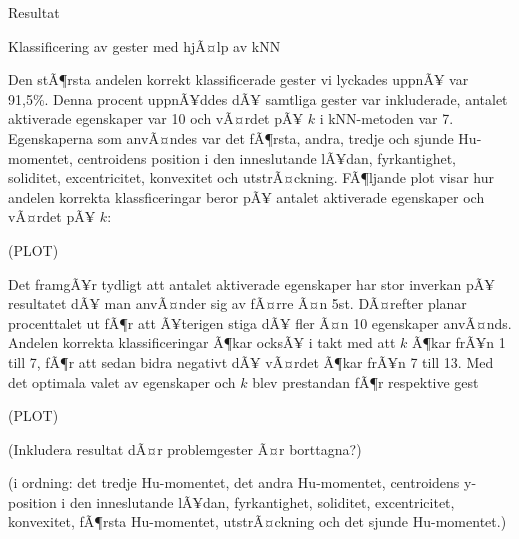 \documentclass[../rapport_MVEX01-11-05]{subfiles}
\begin{document}
Resultat

Klassificering av gester med hjÃ¤lp av kNN

Den stÃ¶rsta andelen korrekt klassificerade gester vi lyckades uppnÃ¥
var 91,5\%. Denna procent uppnÃ¥ddes dÃ¥ samtliga gester var
inkluderade, antalet aktiverade egenskaper var 10 och vÃ¤rdet pÃ¥ $k$
i kNN-metoden var 7. Egenskaperna som anvÃ¤ndes var det fÃ¶rsta,
andra, tredje och sjunde Hu-momentet, centroidens position i den
inneslutande lÃ¥dan, fyrkantighet, soliditet, excentricitet,
konvexitet och utstrÃ¤ckning. FÃ¶ljande plot visar hur andelen
korrekta klassficeringar beror pÃ¥ antalet aktiverade egenskaper och
vÃ¤rdet pÃ¥ $k$:

(PLOT)

Det framgÃ¥r tydligt att antalet aktiverade egenskaper har stor
inverkan pÃ¥ resultatet dÃ¥ man anvÃ¤nder sig av fÃ¤rre Ã¤n
5st. DÃ¤refter planar procenttalet ut fÃ¶r att Ã¥terigen stiga dÃ¥
fler Ã¤n 10 egenskaper anvÃ¤nds. Andelen korrekta klassificeringar
Ã¶kar ocksÃ¥ i takt med att $k$ Ã¶kar frÃ¥n 1 till 7, fÃ¶r att sedan
bidra negativt dÃ¥ vÃ¤rdet Ã¶kar frÃ¥n 7 till 13. Med det optimala
valet av egenskaper och $k$ blev prestandan fÃ¶r respektive gest

(PLOT)

(Inkludera resultat dÃ¤r problemgester Ã¤r borttagna?)

(i ordning: det tredje Hu-momentet, det andra Hu-momentet, centroidens
y-position i den inneslutande lÃ¥dan, fyrkantighet, soliditet,
excentricitet, konvexitet, fÃ¶rsta Hu-momentet, utstrÃ¤ckning och det
sjunde Hu-momentet.) 

\subsection{\knn}
\end{document}
